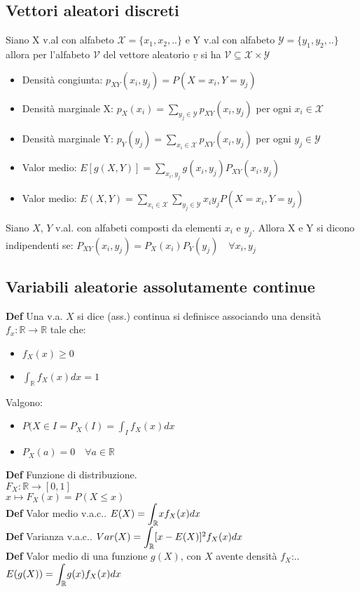 \documentclass[10pt,a4paper]{article}
\begin{document}
\begin{multicols}{2}
\subsection*{Vettori aleatori discreti}
Siano X v.al con alfabeto $\mathcal{X}=\{x_1,x_2,..\}$ e Y v.al con alfabeto $ \mathcal{Y}=\{y_1,y_2,..\}$ allora per l'alfabeto $\mathcal{V}$ del vettore aleatorio $\underline{v}$ si ha $\mathcal{V}\subseteq\mathcal{X}\times\mathcal{Y}$
\begin{itemize}
\item Densità congiunta: $p_{XY}(x_i, y_j) = P(X=x_i, Y=y_j)$
\item Densità marginale X: $p_X(x_i) = \sum\limits_{y_j \in \mathcal{Y}} p_{XY}(x_i,y_j)$ per ogni $x_i \in \mathcal{X}$
\item Densità marginale Y: $p_Y(y_j) = \sum\limits_{x_i \in \mathcal{X}} p_{XY}(x_i,y_j)$ per ogni $y_j \in \mathcal{Y}$
\item Valor medio: $E[g(X, Y)] = \sum_{x_i, y_j} g(x_i, y_j) P_{XY}(x_i, y_j)$
\item Valor medio: $E(X, Y) = \sum_{x_i \in \mathcal{X}} \sum_{y_j \in \mathcal{Y}} x_i y_j P(X=x_i,Y=y_j)$
\end{itemize}
Siano $X$, $Y$ v.al. con alfabeti composti da elementi $x_i$ e $y_j$. Allora X e Y si dicono indipendenti se: $P_{XY}(x_i, y_j) = P_X(x_i)P_Y(y_j) \quad\forall x_i, y_j$


\subsection*{Variabili aleatorie assolutamente continue}

\textbf{Def}
    Una v.a. $X$ si dice (ass.) continua si definisce associando una densit\`a $f_x : \mathbb{R}\to\mathbb{R}$ tale che:
\begin{itemize}
    \item $f_X(x) \geq 0$
    \item $\int_\mathbb{R} f_X(x) dx = 1$
\end{itemize}
Valgono:
\begin{itemize}
    \item $P(X \in I = P_X(I) = \int_I f_X(x)dx$
    \item $P_X(a) = 0\quad\forall a\in\mathbb{R}$
\end{itemize}
\textbf{Def} Funzione di distribuzione. \\  \textit{
    $F_X : \mathbb{R} \to [0, 1]$ \\
    $x \mapsto F_X(x) = P(X \leq x)$
}\\
\textbf{Def} Valor medio v.a.c.. \textit{
    $E(X) = \mathlarger{\int_\mathbb{R}} x f_X(x)dx$
}\\
\textbf{Def} Varianza v.a.c.. \textit{
    $Var(X) = \mathlarger{\int_\mathbb{R}} [x - E(X)]^2 f_X(x)dx$
}\\
\textbf{Def} Valor medio di una funzione $g(X)$, con $X$ avente densità $f_X$:.. \textit{
    $E(g(X)) = \mathlarger{\int_\mathbb{R}} g(x) f_X(x)dx$
}\\









\end{multicols}
\end{document}
